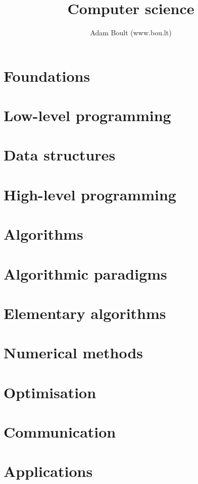 \documentclass[oneside]{book}
\begin{document}
\author{Adam Boult (www.bou.lt)}
\title{Computer science}
\maketitle

\setcounter{tocdepth}{1}
\tableofcontents



\part{Foundations}





\part{Low-level programming}


\part{Data structures}







\part{High-level programming}




\part{Algorithms}



\part{Algorithmic paradigms}





\part{Elementary algorithms}





\part{Numerical methods}





\part{Optimisation}



\part{Communication}





\part{Applications}


\end{document}

